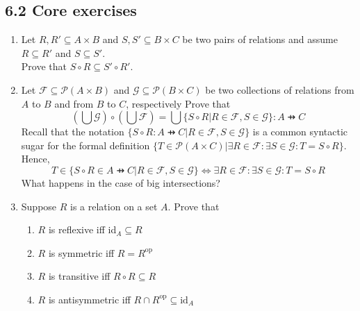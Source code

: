\documentclass[10pt,\jkfside,a4paper]{article}
\begin{document}
\subsection*{6.2 Core exercises}

\begin{enumerate}

\item Let $R, R' \subseteq A \times B$ and $S, S' \subseteq B \times C$ be two pairs of relations 
and assume $R \subseteq R'$ and $S \subseteq S'$.\\
Prove that $S \circ R \subseteq S' \circ R'$.



\item Let $\mathcal{F} \subseteq \mathcal{P}(A \times B)$ and $\mathcal{G} \subseteq \mathcal{P}(B \times C)$ be two 
collections of relations from $A$ to $B$ and from $B$ to $C$, respectively Prove that
\begin{equation}
(\bigcup \mathcal{G})\circ(\bigcup \mathcal{F}) = \bigcup \{S \circ R | R \in \mathcal{F}, S \in \mathcal{G}\}: A \pfun C
\end{equation}
Recall that the notation $\{ S \circ R: A \pfun C | R \in \mathcal{F}, S \in \mathcal{G}\}$ is a common syntactic sugar 
for the formal definition $\{T \in \mathcal{P}(A \times C)| \exists R \in \mathcal{F}: \exists S \in \mathcal{G}: T = S \circ R\}$. Hence,
\begin{equation}
T \in \{S \circ R \in A \pfun C | R \in \mathcal{F}, S \in \mathcal{G}\} \Longleftrightarrow \exists R \in \mathcal{F}: \exists S \in \mathcal{G}: T = S \circ R
\end{equation}
What happens in the case of big intersections?



\item Suppose $R$ is a relation on a set $A$. Prove that

\begin{enumerate}

\item $R$ is reflexive iff id$_A \subseteq R$



\item $R$ is symmetric iff $R = R^{\text{op}}$



\item $R$ is transitive iff $R \circ R \subseteq R$



\item $R$ is antisymmetric iff $R \cap R^{\text{op}} \subseteq \text{id}_A$




\end{enumerate}
\end{enumerate}
\end{document}
